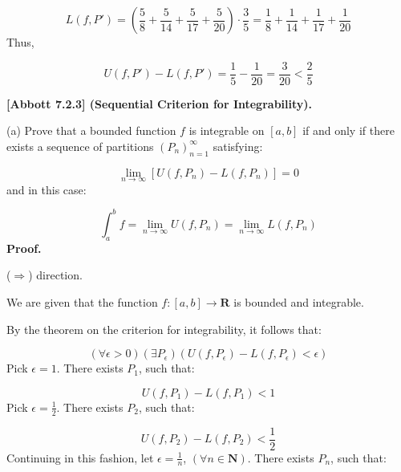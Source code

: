 \documentclass[10pt]{article}
\begin{document}
\begin{equation*}
L( f,P') =\left(\frac{5}{8} +\frac{5}{14} +\frac{5}{17} +\frac{5}{20}\right) \cdotp \frac{3}{5} =\frac{1}{8} +\frac{1}{14} +\frac{1}{17} +\frac{1}{20}
\end{equation*}
Thus,


\begin{equation*}
U( f,P') -L( f,P') =\frac{1}{5} -\frac{1}{20} =\frac{3}{20} < \frac{2}{5}
\end{equation*}


\textbf{[Abbott 7.2.3] (Sequential Criterion for Integrability).} 



(a) Prove that a bounded function $\displaystyle f$ is integrable on $\displaystyle [ a,b]$ if and only if there exists a sequence of partitions $\displaystyle ( P_{n})_{n=1}^{\infty }$ satisfying:


\begin{equation*}
\lim _{n\rightarrow \infty }[ U( f,P_{n}) -L( f,P_{n})] =0
\end{equation*}
and in this case:


\begin{equation*}
\int _{a}^{b} f=\lim _{n\rightarrow \infty } U( f,P_{n}) =\lim _{n\rightarrow \infty } L( f,P_{n})
\end{equation*}
\textbf{Proof.}



($\displaystyle \Longrightarrow $) direction.



We are given that the function $\displaystyle f:[ a,b]\rightarrow \mathbf{R}$ is bounded and integrable.



By the theorem on the criterion for integrability, it follows that:


\begin{equation*}
( \forall \epsilon  >0)( \exists P_{\epsilon })( U( f,P_{\epsilon }) -L( f,P_{\epsilon }) < \epsilon )
\end{equation*}
Pick $\displaystyle \epsilon =1$. There exists $\displaystyle P_{1}$, such that:


\begin{equation*}
U( f,P_{1}) -L( f,P_{1}) < 1
\end{equation*}
Pick $\displaystyle \epsilon =\frac{1}{2}$. There exists $\displaystyle P_{2}$, such that:


\begin{equation*}
U( f,P_{2}) -L( f,P_{2}) < \frac{1}{2}
\end{equation*}
Continuing in this fashion, let $\displaystyle \epsilon =\frac{1}{n}$, $\displaystyle ( \forall n\in \mathbf{N})$. There exists $\displaystyle P_{n}$, such that:
\end{document}
